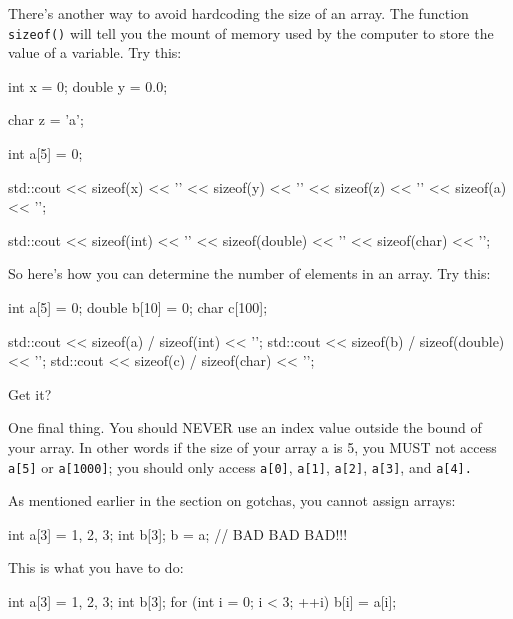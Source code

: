 There's another way to avoid hardcoding the size of an
array. The function \texttt{sizeof()} will tell you the mount of memory
used by the computer to store the value of a variable. Try this:

\begin{consolethree}[escapeinside=||]int x = 0;
double y = 0.0;

char z = 'a';

int a[5] = {0};

std::cout << sizeof(x) << '\n'
          << sizeof(y) << '\n'
          << sizeof(z) << '\n'
          << sizeof(a) << '\n';

std::cout << sizeof(int) << '\n'
          << sizeof(double) << '\n'
          << sizeof(char) << '\n'; 
\end{consolethree}

So here's how you can determine the number of elements
in an array. Try this:

\begin{consolethree}[escapeinside=||]
int a[5] = {0};
double b[10] = {0};
char c[100];

std::cout << sizeof(a) / sizeof(int) << '\n';
std::cout << sizeof(b) / sizeof(double) << '\n';
std::cout << sizeof(c) / sizeof(char) << '\n'; 
\end{consolethree}

Get it?

One final thing. You should NEVER use an index value outside the bound
of your array. In other words if the size of your array a is 5, you MUST
not access \texttt{a[5]} or \texttt{a[1000]}; you should only access
\texttt{a[0]}, \texttt{a[1]}, \texttt{a[2]}, \texttt{a[3]}, and
\texttt{a[4].}

As mentioned earlier in the section on gotchas, you cannot assign
arrays:
\begin{consolethree}
int a[3] = {1, 2, 3};
int b[3];
b = a;               // BAD BAD BAD!!!
\end{consolethree}
This is what you have to do:
\begin{consolethree}
int a[3] = {1, 2, 3};
int b[3];
for (int i = 0; i < 3; ++i)
{
    b[i] = a[i];
}
\end{consolethree}

